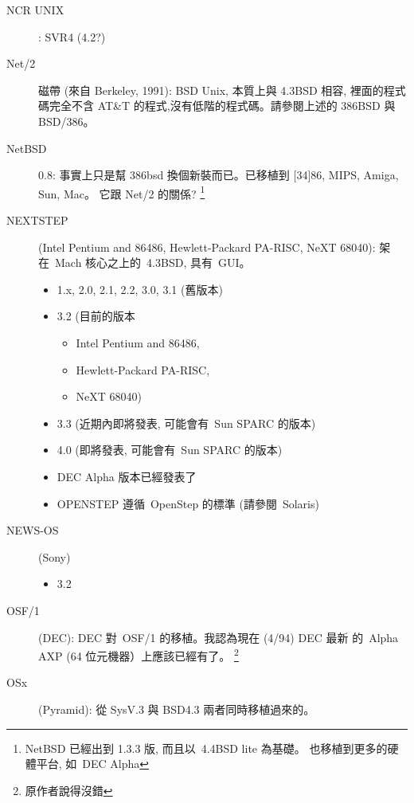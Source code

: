 \documentclass{article}
\begin{document}
\begin{CJK*}{Bg5}{ming}
\begin{description}
      \item [NCR UNIX]: SVR4 (4.2?)

      \item [Net/2] 磁帶 (來自 Berkeley, 1991): BSD Unix, 本質上與 4.3BSD 相容,
         裡面的程式碼完全不含 AT\&T 的程式,沒有低階的程式碼。請參閱上述的
         386BSD 與 BSD/386。

      \item [NetBSD] 0.8: 事實上只是幫 386bsd 換個新裝而已。已移植到 [34]86, MIPS,
         Amiga, Sun, Mac。 它跟 Net/2 的關係?
        \footnote{NetBSD 已經出到 1.3.3 版, 而且以~4.4BSD lite 為基礎。
                 也移植到更多的硬體平台, 如~DEC Alpha}

      \item [NEXTSTEP] (Intel Pentium and 86486, Hewlett-Packard PA-RISC, NeXT 68040):
         架在~Mach 核心之上的~4.3BSD, 具有~GUI。
	\begin{itemize}
         \item 1.x, 2.0, 2.1, 2.2, 3.0, 3.1 (舊版本)
         \item 3.2 (目前的版本
	 \begin{itemize}
            \item  Intel Pentium and 86486,
            \item  Hewlett-Packard PA-RISC,
            \item  NeXT 68040)
	 \end{itemize}
         \item 3.3 (近期內即將發表, 可能會有~Sun SPARC 的版本)
         \item 4.0 (即將發表, 可能會有~Sun SPARC 的版本)
         \item DEC Alpha 版本已經發表了
         \item OPENSTEP 遵循~OpenStep 的標準 (請參閱~Solaris)
	\end{itemize}

      \item [NEWS-OS] (Sony)
	\begin{itemize}
         \item 3.2
	\end{itemize}

     \item [OSF/1] (DEC): DEC 對~OSF/1 的移植。我認為現在 (4/94) DEC 最新
        的~Alpha AXP (64 位元機器）上應該已經有了。
        \footnote{原作者說得沒錯}

     \item [OSx] (Pyramid): 從 SysV.3 與 BSD4.3 兩者同時移植過來的。


\end{description}
\end{CJK*}
\end{document}
